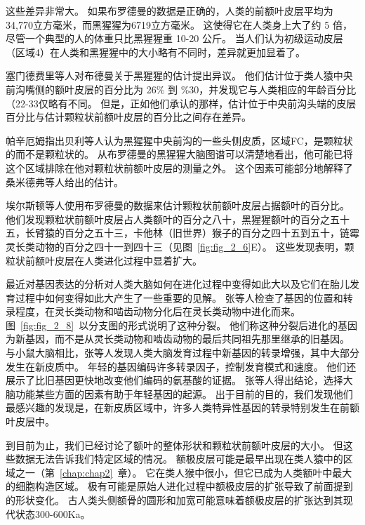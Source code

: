 这些差异非常大。
如果布罗德曼的数据是正确的，人类的前额叶皮层平均为34,770立方毫米，而黑猩猩为6719立方毫米。
这使得它在人类身上大了约 5 倍，尽管一个典型的人的体重只比黑猩猩重 10-20 公斤。
当人们认为初级运动皮层（区域4）在人类和黑猩猩中的大小略有不同时，差异就更加显着了\cite{preuss2011human}。
\par


塞门德费里等人\cite{semendeferi2002humans}对布德曼关于黑猩猩的估计提出异议。
他们估计位于类人猿中央前沟嘴侧的额叶皮层的百分比为 26\% 到 \%30，并发现它与人类相应的年龄百分比（22-33仅略有不同。
但是，正如他们承认的那样，估计位于中央前沟头端的皮层百分比与估计颗粒状前额叶皮层的百分比之间存在差异。
\par


帕辛厄姆\cite{passingham2008special}指出贝利等人\cite{bailey1950isocortex}认为黑猩猩中央前沟的一些头侧皮质，区域FC，是颗粒状的而不是颗粒状的。
从布罗德曼\cite{brodmann1912neue}的黑猩猩大脑图谱可以清楚地看出，他可能已将这个区域排除在他对颗粒状前额叶皮层的测量之外。
这个因素可能部分地解释了桑米德弗等人给出的估计。
\par


埃尔斯顿等人\cite{elston2007specialization}使用布罗德曼的数据来估计颗粒状前额叶皮层占据额叶的百分比。
他们发现颗粒状前额叶皮层占人类额叶的百分之八十，黑猩猩额叶的百分之五十五，长臂猿的百分之五十三，卡他林（旧世界）猴子的百分之四十五到五十，链霉灵长类动物的百分之四十一到四十三（见图~\ref{fig:fig_2_6}E）。
这些发现表明，颗粒状前额叶皮层在人类进化过程中显着扩大。
\par


最近对基因表达的分析对人类大脑如何在进化过程中变得如此大以及它们在胎儿发育过程中如何变得如此大产生了一些重要的见解。
张等人\cite{zhang2011accelerated}检查了基因的位置和转录程度，在灵长类动物和啮齿动物分化后在灵长类动物中进化而来。
图~\ref{fig:fig_2_8}~以分支图的形式说明了这种分裂。
他们称这种分裂后进化的基因为新基因，而不是从灵长类动物和啮齿动物的最后共同祖先那里继承的旧基因。
与小鼠大脑相比，张等人发现人类大脑发育过程中新基因的转录增强，其中大部分发生在新皮质中。
年轻的基因编码许多转录因子，控制发育模式和速度。
他们还展示了比旧基因更快地改变他们编码的氨基酸的证据。
张等人得出结论，选择大脑功能某些方面的因素有助于年轻基因的起源。
出于目前的目的，我们发现他们最感兴趣的发现是，在新皮质区域中，许多人类特异性基因的转录特别发生在前额叶皮层中。
\par


到目前为止，我们已经讨论了额叶的整体形状和颗粒状前额叶皮层的大小。
但这些数据无法告诉我们特定区域的情况。
额极皮层可能是最早出现在类人猿中的区域之一（第~\ref{chap:chap2}~章）。
它在类人猴中很小，但它已成为人类额叶中最大的细胞构造区域。
极有可能是原始人进化过程中额极皮层的扩张导致了前面提到的形状变化。
古人类头侧额骨的圆形和加宽可能意味着额极皮层的扩张达到其现代状态300-600Ka。
\par


